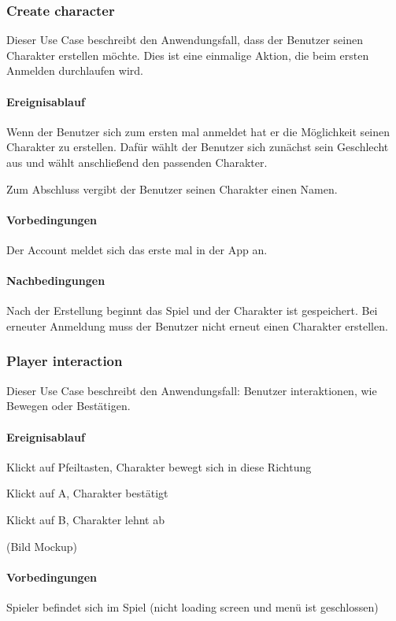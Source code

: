 		\subsubsection{Create character}
			Dieser Use Case beschreibt den Anwendungsfall, dass der Benutzer seinen Charakter erstellen möchte. Dies ist eine einmalige Aktion, die beim ersten Anmelden durchlaufen wird. 
			
			\paragraph{Ereignisablauf}
				Wenn der Benutzer sich zum ersten mal anmeldet hat er die Möglichkeit seinen Charakter zu erstellen. Dafür wählt der Benutzer sich zunächst sein Geschlecht aus und wählt anschließend den passenden Charakter.
			
				Zum Abschluss vergibt der Benutzer seinen Charakter einen Namen.
	
			\paragraph{Vorbedingungen}
				Der Account meldet sich das erste mal in der App an.
			
			\paragraph{Nachbedingungen}
				Nach der Erstellung beginnt das Spiel und der Charakter ist gespeichert. Bei erneuter Anmeldung muss der Benutzer nicht erneut einen Charakter erstellen.
	
		\subsubsection{Player interaction}
			Dieser Use Case beschreibt den Anwendungsfall: Benutzer interaktionen, wie Bewegen oder Bestätigen.
			
			\paragraph{Ereignisablauf}
				Klickt auf Pfeiltasten, Charakter bewegt sich in diese Richtung
			
				Klickt auf A, Charakter bestätigt
			
				Klickt auf B, Charakter lehnt ab
			
				(Bild Mockup)
			
			\paragraph{Vorbedingungen}
				Spieler befindet sich im Spiel (nicht loading screen und menü ist geschlossen)
			

